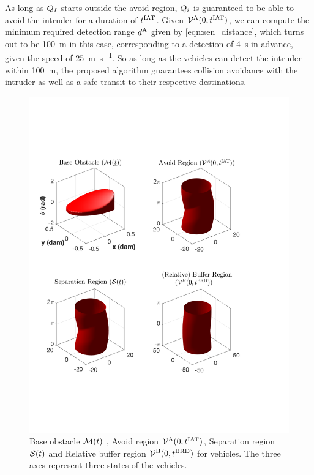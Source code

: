 As long as $Q_{I}$ starts outside the avoid region, $Q_i$ is guaranteed to be able to avoid the intruder for a duration of $t^\text{IAT}$. Given $\mathcal{V}^{\text{A}}(0, t^\text{IAT})$, we can compute the minimum required detection range $d^\text{A}$ given by \eqref{eqn:sen_distance}, which turns out to be \SI{100}{\m} in this case, corresponding to a detection of \SI{4}{\s} in advance, given the speed of \SI{25}{\m\per\s}. So as long as the vehicles can detect the intruder within \SI{100}{\m}, the proposed algorithm guarantees collision avoidance with the intruder as well as a safe transit to their respective destinations.   
\begin{figure}[H]
  \centering
  \includegraphics[width=\columnwidth]{"figs/bufferRegion_steps"}
  \caption{Base obstacle $\mathcal{M}(t)$ , Avoid region $\mathcal{V}^{\text{A}}(0, t^\text{IAT})$, Separation region $\mathcal{S}(t)$ and Relative buffer region $\mathcal{V}^{\text{B}}(0, t^\text{BRD})$ for vehicles. The three axes represent three states of the vehicles.}
  \label{fig:MaxMin}
\end{figure}

